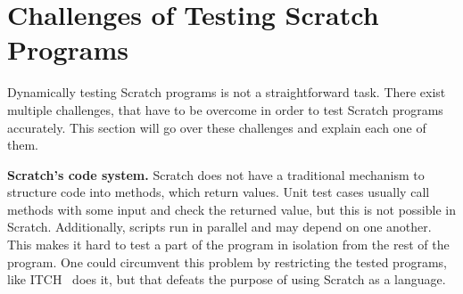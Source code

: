 %
%
%

\section{Challenges of Testing Scratch Programs}

Dynamically testing Scratch programs is not a straightforward task.
There exist multiple challenges, that have to be overcome in order to test Scratch programs accurately.
This section will go over these challenges and explain each one of them.
\parspace

\textbf{Scratch's code system.}
Scratch does not have a traditional mechanism to structure code into methods, which return values.
Unit test cases usually call methods with some input and check the returned value, but this is not possible in Scratch.
Additionally, scripts run in parallel and may depend on one another.
This makes it hard to test a part of the program in isolation from the rest of the program.
One could circumvent this problem by restricting the tested programs, like ITCH~\cite{itch} does it,
but that defeats the purpose of using Scratch as a language.
\parspace

